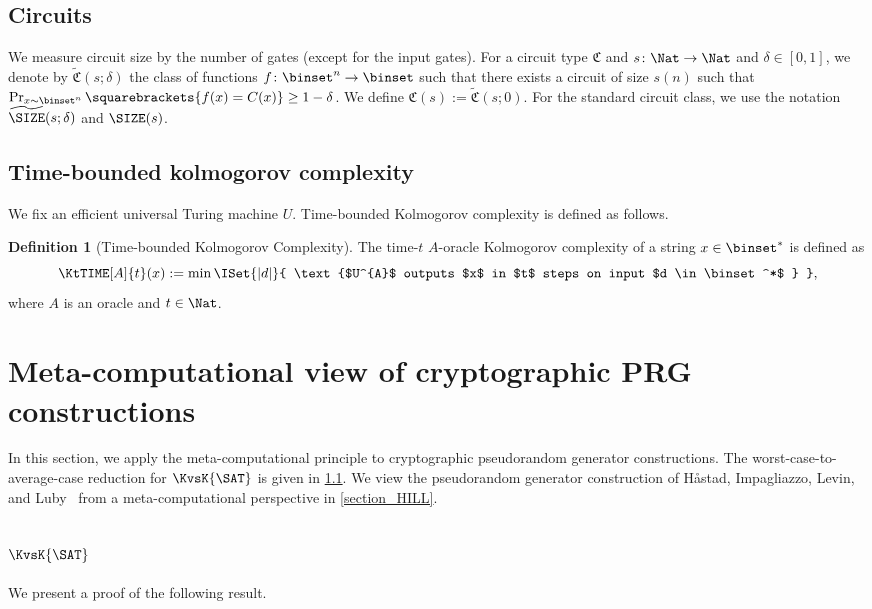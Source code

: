 \documentclass[11pt]{article}
\numberwithin{equation}{section}
\theoremstyle{definition}
\newtheorem{definition}[theorem]{Definition}
\theoremstyle{plain}
\begin{document}
\subsection{Circuits}
We measure circuit size by the number of gates (except for the input gates).
For a circuit type $\mathfrak{C}$ and $s \colon \Nat \to \Nat$ and $\delta \in [0, 1]$,
we denote by $\widetilde{\mathfrak{C}}(s; \delta)$
the class of functions $f \colon \binset^n \to \binset$
such that
there exists a circuit of size $s(n)$
such that
$\Pr_{x \sim \binset^n} \squarebrackets{ f(x) = C(x) } \ge 1 - \delta$.
We define $\mathfrak{C}(s) := \widetilde{\mathfrak{C}}(s; 0)$.
For the standard circuit class,
we use the notation $\widetilde{\SIZE}(s; \delta)$ and $\SIZE(s)$.


\subsection{Time-bounded kolmogorov complexity}
We fix an efficient universal Turing machine $U$.
Time-bounded Kolmogorov complexity is defined as follows.
\begin{definition}
  [Time-bounded Kolmogorov Complexity]
  The time-$t$ $A$-oracle Kolmogorov complexity of a string $x \in \binset^*$
  is defined as
  $$
    \KtTIME[A]{t}(x) := \min \ISet{ |d| } { \text{$U^{A}$ outputs $x$ in $t$ steps on input $d \in \binset^*$ } },
  $$
  where $A$ is an oracle and $t \in \Nat$.
\end{definition}


\section{Meta-computational view of cryptographic PRG constructions}

In this section,
we apply the meta-computational principle to cryptographic pseudorandom generator constructions.
The worst-case-to-average-case reduction for $\KvsK{\SAT}$
is given in \cref{section_Heuristica}.
We view the pseudorandom generator construction of
H{\aa}stad, Impagliazzo, Levin, and Luby~\cite{HastadILL99_siamcomp_journals}
from a meta-computational perspective
in \cref{section_HILL}.

\subsection{\texorpdfstring{$\KvsK{\SAT}$}{Gap(K(SAT) vs K)}}
\label{section_Heuristica}

We present a proof of the following result.
\end{document}
